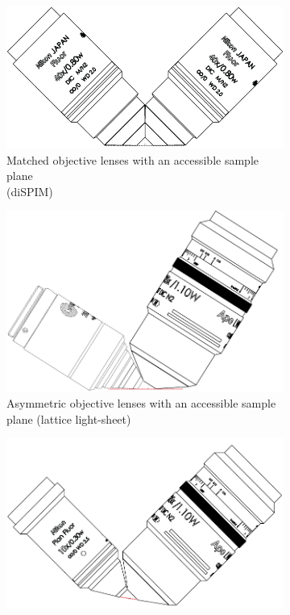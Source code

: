 \begin{figure}
    \centering\hfill
    \begin{subfigure}[t]{0.45\linewidth}
        \centering
        \includegraphics[width=0.9\linewidth]{./matched_objectives}
        \caption{Matched objective lenses with an accessible \gls{sample plane} \\ (\gls{diSPIM})}\label{fig:matched_objectives}
        \end{subfigure}\hfill
    \begin{subfigure}[t]{0.45\linewidth}
        \centering
        \includegraphics[width=0.9\linewidth]{./asymmetric_special}
        \caption{Asymmetric objective lenses with an accessible \gls{sample plane} (\gls{lattice light-sheet})}\label{fig:asymmetric_special}
    \end{subfigure}\hfill
    \begin{subfigure}[t]{0.45\linewidth}
        \centering
        \includegraphics[width=0.9\linewidth]{./assymetric_nikon}

\end{subfigure}
\end{figure}
